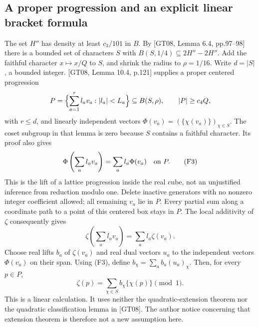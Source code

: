 \documentclass[11pt]{article}
\begin{document}
\subsection*{A proper progression and an explicit linear bracket formula}
The set $H''$ has density at least $c_3/101$ in $B$.
By [GT08, Lemma 6.4, pp.97--98] there is a bounded set of characters $S$
with $B(S,1/4)\subseteq2H''-2H''$.
Add the faithful character $x\mapsto x/Q$ to $S$, and shrink the radius
to $\rho=1/16$. Write $d=|S|$, a bounded integer.
[GT08, Lemma 10.4, p.121] supplies a proper centered progression
\[
 P=\Bigl\{\sum_{a=1}^r l_av_a: |l_a|<L_a\Bigr\}\subseteq B(S,\rho),
              \qquad |P|\geq c_4 Q,
\]
with $r\leq d$, and linearly independent vectors
$\Phi(v_a)=(\{\chi(v_a)\})_{\chi\in S}$.
The coset subgroup in that lemma is zero because $S$ contains a faithful
character. Its proof also gives
\[
 \Phi\left(\sum_a l_av_a\right)=\sum_a l_a\Phi(v_a)\quad\hbox{on }P. \tag{F3}
\]
This is the lift of a lattice progression inside the real cube, not an
unjustified inference from reduction modulo one. Delete inactive generators
with no nonzero integer coefficient allowed; all remaining $v_a$ lie in $P$.
Every partial sum along a coordinate path to a point of this centered box
stays in $P$. The local additivity of $\zeta$ consequently gives
\[
          \zeta\left(\sum_a l_av_a\right)=\sum_a l_a\zeta(v_a).
\]
Choose real lifts $b_a$ of $\zeta(v_a)$ and real dual vectors $u_a$ to the
independent vectors $\Phi(v_a)$ on their span. Using (F3), define
$b_\chi=\sum_a b_a(u_a)_\chi$. Then, for every $p\in P$,
\[
                 \zeta(p)=\sum_{\chi\in S}b_\chi\{\chi(p)\}\pmod1. \tag{F4}
\]
This is a linear calculation. It uses neither the quadratic-extension
theorem nor the quadratic classification lemma in [GT08]. The author notice
concerning that extension theorem is therefore not a new assumption here.
\end{document}
